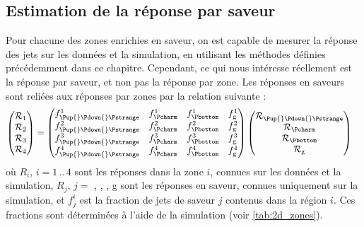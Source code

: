 \subsection{Estimation de la réponse par saveur}

Pour chacune des zones enrichies en saveur, on est capable de mesurer la réponse des jets sur les données et la simulation, en utilisant les méthodes définies précédemment dans ce chapitre. Cependant, ce qui nous intéresse réellement est la réponse par saveur, et non pas la réponse par zone. Les réponses en saveurs sont reliées aux réponses par zones par la relation suivante :
\begin{align} \label{eq:resp_zone}
  \begin{pmatrix}
    \mathcal{R}_1 \\ \mathcal{R}_2 \\ \mathcal{R}_3 \\ \mathcal{R}_4
  \end{pmatrix}
  &=
  \begin{pmatrix}
    f^1_{\text{\Pup{}\Pdown{}\Pstrange}} & f^1_{\Pcharm} & f^1_{\Pbottom} & f^1_\text{g} \\
    f^2_{\text{\Pup{}\Pdown{}\Pstrange}} & f^2_{\Pcharm} & f^2_{\Pbottom} & f^2_\text{g} \\
    f^3_{\text{\Pup{}\Pdown{}\Pstrange}} & f^3_{\Pcharm} & f^3_{\Pbottom} & f^3_\text{g} \\
    f^4_{\text{\Pup{}\Pdown{}\Pstrange}} & f^4_{\Pcharm} & f^4_{\Pbottom} & f^4_\text{g}
  \end{pmatrix}
  \begin{pmatrix}
    \mathcal{R_\text{\Pup{}\Pdown{}\Pstrange}} \\
    \mathcal{R_{\Pcharm}} \\
    \mathcal{R_{\Pbottom}} \\
    \mathcal{R_\text{g}}
  \end{pmatrix}
\end{align}
où $R_i$, $i = 1\,..\,4$ sont les réponses dans la zone $i$, connues sur les données et la simulation, $R_j$, $j = $ \Pup{}\Pdown{}\Pstrange, \Pcharm, \Pbottom, g sont les réponses en saveur, connues uniquement sur la simulation, et $f^i_j$ est la fraction de jets de saveur $j$ contenus dans la région $i$. Ces fractions sont déterminées à l'aide de la simulation (voir \cref{tab:2d_zones}).

